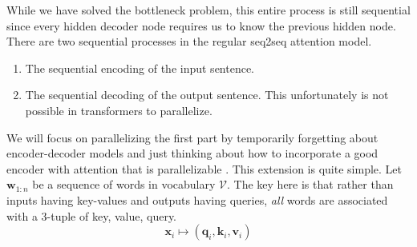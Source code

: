 \documentclass{article}
\begin{document}
    While we have solved the bottleneck problem, this entire process is still sequential since every hidden decoder node requires us to know the previous hidden node. There are two sequential processes in the regular seq2seq attention model. 
    \begin{enumerate}
      \item The sequential encoding of the input sentence. 
      \item The sequential decoding of the output sentence. This unfortunately is not possible in transformers to parallelize. 
    \end{enumerate}

    We will focus on parallelizing the first part by temporarily forgetting about encoder-decoder models and just thinking about how to incorporate a good encoder with attention that is parallelizable \cite{vaswani2017attention}. This extension is quite simple. Let $\mathbf{w}_{1:n}$ be a sequence of words in vocabulary $\mathcal{V}$. The key here is that rather than inputs having key-values and outputs having queries, \textit{all} words are associated with a 3-tuple of key, value, query. 
    \begin{equation}
      \mathbf{x}_i \mapsto (\mathbf{q}_i, \mathbf{k}_i, \mathbf{v}_i)
    \end{equation}
\end{document}
